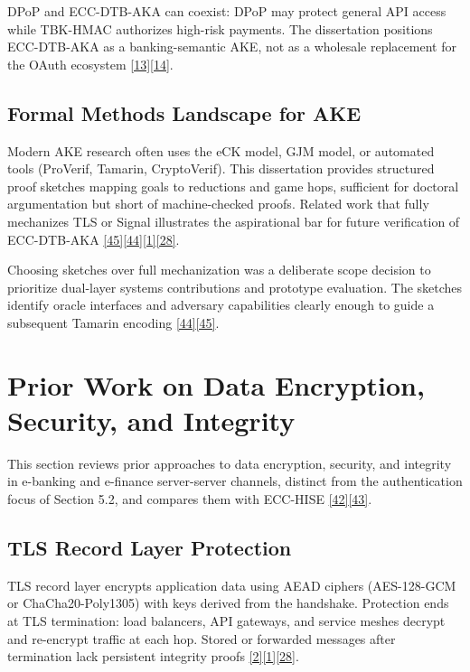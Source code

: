 \indent DPoP and ECC-DTB-AKA can coexist: DPoP may protect general API access while TBK-HMAC authorizes high-risk payments. The dissertation positions ECC-DTB-AKA as a banking-semantic AKE, not as a wholesale replacement for the OAuth ecosystem \hyperref[ref:13]{[13]}\hyperref[ref:14]{[14]}.

\subsection{Formal Methods Landscape for AKE}

\indent Modern AKE research often uses the eCK model, GJM model, or automated tools (ProVerif, Tamarin, CryptoVerif). This dissertation provides structured proof sketches mapping goals to reductions and game hops, sufficient for doctoral argumentation but short of machine-checked proofs. Related work that fully mechanizes TLS or Signal illustrates the aspirational bar for future verification of ECC-DTB-AKA \hyperref[ref:45]{[45]}\hyperref[ref:44]{[44]}\hyperref[ref:1]{[1]}\hyperref[ref:28]{[28]}.

\indent Choosing sketches over full mechanization was a deliberate scope decision to prioritize dual-layer systems contributions and prototype evaluation. The sketches identify oracle interfaces and adversary capabilities clearly enough to guide a subsequent Tamarin encoding \hyperref[ref:44]{[44]}\hyperref[ref:45]{[45]}.

\section{Prior Work on Data Encryption, Security, and Integrity}

\indent This section reviews prior approaches to data encryption, security, and integrity in e-banking and e-finance server-server channels, distinct from the authentication focus of Section 5.2, and compares them with ECC-HISE \hyperref[ref:42]{[42]}\hyperref[ref:43]{[43]}.

\subsection{TLS Record Layer Protection}

\indent TLS record layer encrypts application data using AEAD ciphers (AES-128-GCM or ChaCha20-Poly1305) with keys derived from the handshake. Protection ends at TLS termination: load balancers, API gateways, and service meshes decrypt and re-encrypt traffic at each hop. Stored or forwarded messages after termination lack persistent integrity proofs \hyperref[ref:2]{[2]}\hyperref[ref:1]{[1]}\hyperref[ref:28]{[28]}.

